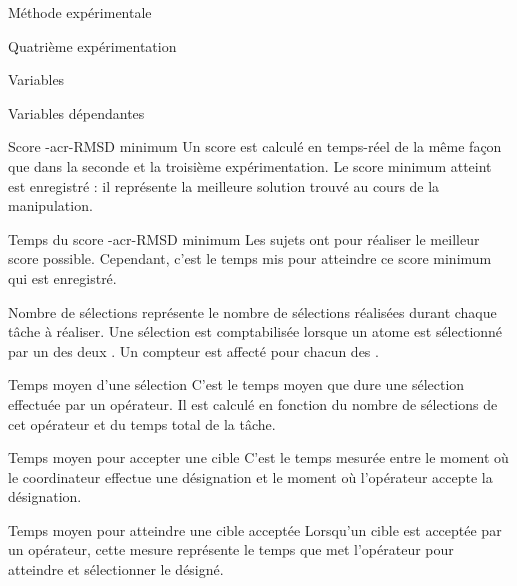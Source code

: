 \documentclass[myfrancais,ngerman,english,frenchb]{mythesis}
\begin{document}
\begin{mychapter}{Méthode expérimentale}
\begin{mysection}{Quatrième expérimentation}
\begin{mysubsection}{Variables}
				\begin{mysubsubsection}{Variables dépendantes}
					\begin{myparagraph}{ Score \myacronl-{acr-RMSD} minimum}
						Un score  est calculé en temps-réel de la même façon que dans la seconde et la troisième expérimentation.
						Le score minimum atteint est enregistré : il représente la meilleure solution trouvé au cours de la manipulation.
					\end{myparagraph}
					\begin{myparagraph}{ Temps du score \myacronl-{acr-RMSD} minimum}
						Les sujets ont  pour réaliser le meilleur score  possible.
						Cependant, c'est le temps mis pour atteindre ce score minimum qui est enregistré.
					\end{myparagraph}
					\begin{myparagraph}{ Nombre de sélections}
						 représente le nombre de sélections réalisées durant chaque tâche à réaliser.
						Une sélection est comptabilisée lorsque un atome est sélectionné par un des deux .
						Un compteur est affecté pour chacun des .
					\end{myparagraph}
					\begin{myparagraph}{ Temps moyen d'une sélection}
						C'est le temps moyen que dure une sélection effectuée par un opérateur.
						Il est calculé en fonction du nombre de sélections de cet opérateur et du temps total de la tâche.
					\end{myparagraph}
					\begin{myparagraph}{ Temps moyen pour accepter une cible}
						C'est le temps mesurée entre le moment où le coordinateur effectue une désignation et le moment où l'opérateur accepte la désignation.
					\end{myparagraph}
					\begin{myparagraph}{ Temps moyen pour atteindre une cible acceptée}
						Lorsqu'un cible est acceptée par un opérateur, cette mesure représente le temps que met l'opérateur pour atteindre et sélectionner le  désigné.
					\end{myparagraph}

\end{mysubsubsection}
\end{mysubsection}
\end{mysection}
\end{mychapter}
\end{document}
